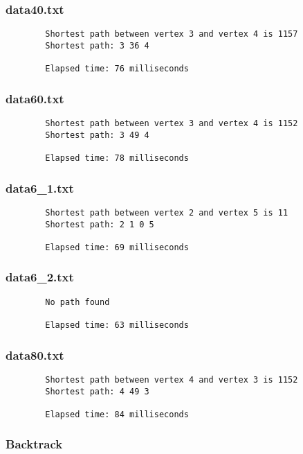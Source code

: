 \documentclass{article}
\begin{document}
    \subsubsection*{data40.txt}
    \begin{verbatim}
        Shortest path between vertex 3 and vertex 4 is 1157
        Shortest path: 3 36 4

        Elapsed time: 76 milliseconds
    \end{verbatim}

    \subsubsection*{data60.txt}
    \begin{verbatim}
        Shortest path between vertex 3 and vertex 4 is 1152
        Shortest path: 3 49 4

        Elapsed time: 78 milliseconds
    \end{verbatim}

    \subsubsection*{data6\_1.txt}
    \begin{verbatim}
        Shortest path between vertex 2 and vertex 5 is 11
        Shortest path: 2 1 0 5

        Elapsed time: 69 milliseconds
    \end{verbatim}

    \subsubsection*{data6\_2.txt}
    \begin{verbatim}
        No path found

        Elapsed time: 63 milliseconds
    \end{verbatim}

    \subsubsection*{data80.txt}
    \begin{verbatim}
        Shortest path between vertex 4 and vertex 3 is 1152
        Shortest path: 4 49 3

        Elapsed time: 84 milliseconds
    \end{verbatim}

    \subsubsection{Backtrack}
\end{document}
